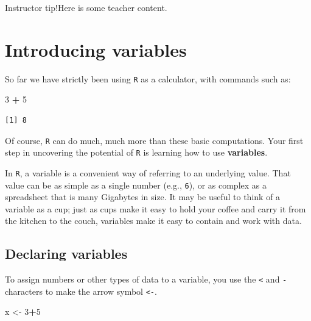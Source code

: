 \documentclass[
]{book}
\newenvironment{Shaded}{\begin{snugshade}}{\end{snugshade}}
\newcommand{\DecValTok}[1]{\textcolor[rgb]{0.00,0.00,0.81}{#1}}
\newcommand{\NormalTok}[1]{#1}
\newcommand{\OperatorTok}[1]{\textcolor[rgb]{0.81,0.36,0.00}{\textbf{#1}}}
\newcommand{\StringTok}[1]{\textcolor[rgb]{0.31,0.60,0.02}{#1}}
\begin{document}
Instructor tip!Here is some teacher content.

\hypertarget{introducing-variables}{%
\section*{Introducing variables}\label{introducing-variables}}

So far we have strictly been using \texttt{R} as a calculator, with commands such as:

\begin{Shaded}
\begin{Highlighting}[]
\DecValTok{3} \OperatorTok{+}\StringTok{ }\DecValTok{5}
\end{Highlighting}
\end{Shaded}

\begin{verbatim}
[1] 8
\end{verbatim}

Of course, \texttt{R} can do much, much more than these basic computations. Your first step in uncovering the potential of \texttt{R} is learning how to use \textbf{variables}.

In \texttt{R}, a variable is a convenient way of referring to an underlying value. That value can be as simple as a single number (e.g., \texttt{6}), or as complex as a spreadsheet that is many Gigabytes in size. It may be useful to think of a variable as a cup; just as cups make it easy to hold your coffee and carry it from the kitchen to the couch, variables make it easy to contain and work with data.

\hypertarget{declaring-variables}{%
\subsection*{Declaring variables}\label{declaring-variables}}

To assign numbers or other types of data to a variable, you use the \texttt{\textless{}} and \texttt{-} characters to make the arrow symbol \texttt{\textless{}-}.

\begin{Shaded}
\begin{Highlighting}[]
\NormalTok{x <-}\StringTok{ }\DecValTok{3}\OperatorTok{+}\DecValTok{5}
\end{Highlighting}
\end{Shaded}
\end{document}
